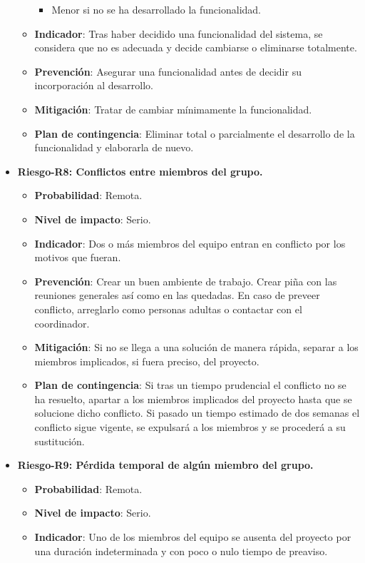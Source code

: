 \begin{itemize}
\begin{itemize}
\begin{itemize}
			\item Menor si no se ha desarrollado la funcionalidad.
			\end{itemize}
		\item{ \bf Indicador}: Tras haber decidido una funcionalidad del sistema, se considera que no es adecuada y decide cambiarse o eliminarse totalmente.
		\item{ \bf Prevención}: Asegurar una funcionalidad antes de decidir su incorporación al desarrollo.
		\item{ \bf Mitigación}: Tratar de cambiar mínimamente la funcionalidad.
		\item{ \bf Plan de contingencia}: Eliminar total o parcialmente el desarrollo de la funcionalidad y elaborarla de nuevo.\\
		\end{itemize}
\item { \bf Riesgo-R8: Conflictos entre miembros del grupo.}
		\begin{itemize}	
		\item{ \bf Probabilidad}: Remota.
		\item{ \bf Nivel de impacto}: Serio.
		\item{ \bf Indicador}: Dos o más miembros del equipo entran en conflicto por los motivos que fueran.
		\item{ \bf Prevención}: Crear un buen ambiente de trabajo. Crear piña con las reuniones generales así como en las quedadas. En caso de preveer conflicto, arreglarlo como personas adultas o contactar con el coordinador.
		\item{ \bf Mitigación}: Si no se llega a una solución de manera rápida, separar a los miembros implicados, si fuera preciso, del proyecto.
		\item{ \bf Plan de contingencia}: Si tras un tiempo prudencial el conflicto no se ha resuelto, apartar a los miembros implicados del proyecto hasta que se solucione dicho conflicto. Si pasado un tiempo estimado de dos semanas el conflicto sigue vigente, se expulsará a los miembros y se procederá a su sustitución.\\
		\end{itemize}
\item { \bf Riesgo-R9: Pérdida temporal de algún miembro del grupo.}
		\begin{itemize}	
		\item{ \bf Probabilidad}: Remota.
		\item{ \bf Nivel de impacto}: Serio.
		\item{ \bf Indicador}: Uno de los miembros del equipo se ausenta del proyecto por una duración indeterminada y con poco o nulo tiempo de preaviso.

\end{itemize}
\end{itemize}
